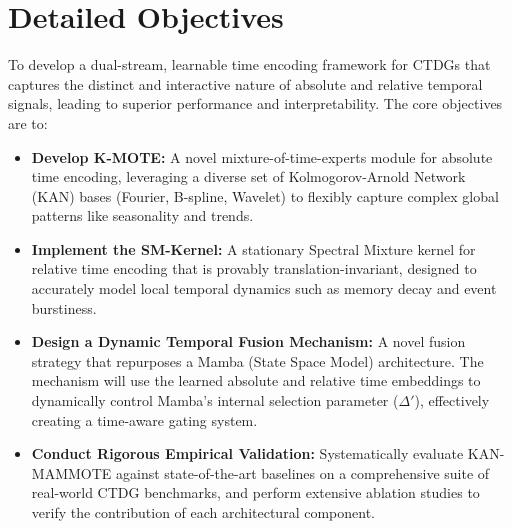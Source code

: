 \documentclass{article}
\begin{document}
\section*{Detailed Objectives}
To develop a dual-stream, learnable time encoding framework for CTDGs that captures the distinct and interactive nature of absolute and relative temporal signals, leading to superior performance and interpretability. The core objectives are to:
\begin{itemize}
  \item \textbf{Develop K-MOTE:} A novel mixture-of-time-experts module for absolute time encoding, leveraging a diverse set of Kolmogorov-Arnold Network (KAN) bases (Fourier, B-spline, Wavelet) to flexibly capture complex global patterns like seasonality and trends.
  \item \textbf{Implement the SM-Kernel:} A stationary Spectral Mixture kernel for relative time encoding that is provably translation-invariant, designed to accurately model local temporal dynamics such as memory decay and event burstiness.
  \item \textbf{Design a Dynamic Temporal Fusion Mechanism:} A novel fusion strategy that repurposes a Mamba (State Space Model) architecture. The mechanism will use the learned absolute and relative time embeddings to dynamically control Mamba's internal selection parameter ($\Delta'$), effectively creating a time-aware gating system.
  \item \textbf{Conduct Rigorous Empirical Validation:} Systematically evaluate KAN-MAMMOTE against state-of-the-art baselines on a comprehensive suite of real-world CTDG benchmarks, and perform extensive ablation studies to verify the contribution of each architectural component.
\end{itemize}
\end{document}
